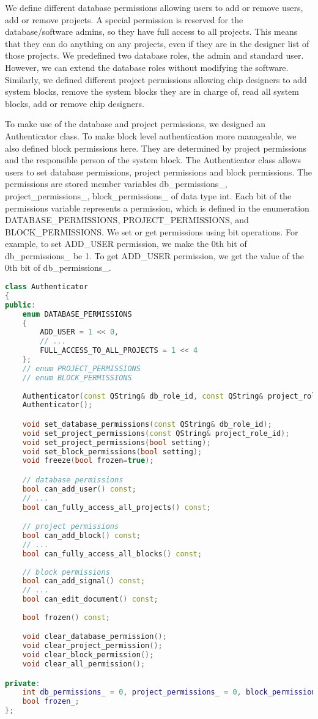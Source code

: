 We define different database permissions allowing users to add or remove users, add or remove projects. A special permission is reserved for the database/software admins, so they have full access to all projects. This means that they can do anything on any projects, even if they are in the designer list of those projects. We predefined two database roles, the admin and standard user. However, we can extend the database roles without modifying the software. Similarly, we defined different project permissions allowing chip designers to add system blocks, remove the system blocks they are in charge of, read all system blocks, add or remove chip designers.

To make use of the database and project permissions, we designed an Authenticator class. To make block level authentication more manageable, we also defined block permissions here. They are determined by project permissions and the responsible person of the system block. The Authenticator class allows users to set database permissions, project permissions and block permissions. The permissions are stored member variables db\_permissions\_, project\_permissions\_, block\_permissions\_ of data type int. Each bit of the permissions variable represents a permission, which is defined in the enumeration DATABASE\_PERMISSIONS, PROJECT\_PERMISSIONS, and BLOCK\_PERMISSIONS. We set or get permissions using bit operations. For example, to set ADD\_USER permission, we make the 0th bit of db\_permissions\_ be 1. To get ADD\_USER permission, we get the value of the 0th bit of db\_permissions\_.

\begin{lstlisting}[language=C++]
class Authenticator
{
public:
    enum DATABASE_PERMISSIONS
    {
        ADD_USER = 1 << 0,
        // ...
        FULL_ACCESS_TO_ALL_PROJECTS = 1 << 4
    };
    // enum PROJECT_PERMISSIONS
    // enum BLOCK_PERMISSIONS
    
    Authenticator(const QString& db_role_id, const QString& project_role_id);
    Authenticator();

    void set_database_permissions(const QString& db_role_id);
    void set_project_permissions(const QString& project_role_id);
    void set_project_permissions(bool setting);
    void set_block_permissions(bool setting);
    void freeze(bool frozen=true);

    // database permissions
    bool can_add_user() const;
    // ...
    bool can_fully_access_all_projects() const;

    // project permissions
    bool can_add_block() const;
    // ...
    bool can_fully_access_all_blocks() const;
    
    // block permissions
    bool can_add_signal() const;
    // ...
    bool can_edit_document() const;
    
    bool frozen() const;

    void clear_database_permission();
    void clear_project_permission();
    void clear_block_permission();
    void clear_all_permission();

private:
    int db_permissions_ = 0, project_permissions_ = 0, block_permissions_;
    bool frozen_;
};
\end{lstlisting}

